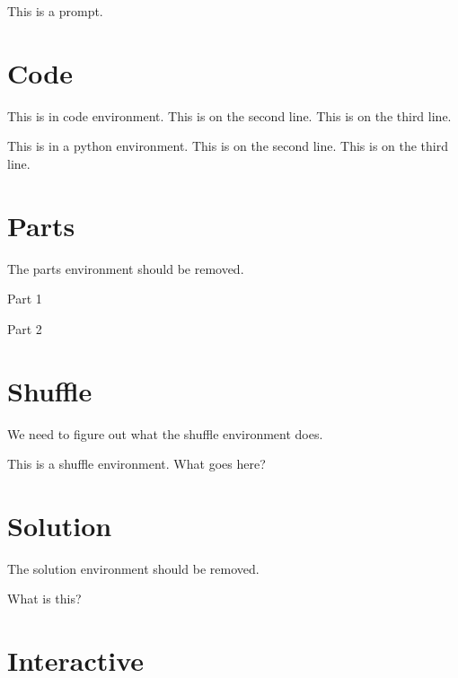 \documentclass{ximera}
\begin{document}
\begin{prompt}
This is a prompt.
\end{prompt}

\section{Code}

\begin{code}
This is in code environment.
This is on the second line.
This is on the third line.
\end{code}

\begin{python}
This is in a python environment.
This is on the second line.
This is on the third line.
\end{python}

\section{Parts}

The parts environment should be removed.

\begin{parts} %
\item Part 1
\item Part 2
\end{parts}

\section{Shuffle}

We need to figure out what the shuffle environment does.

\begin{shuffle}
This is a shuffle environment. What goes here?
\end{shuffle}



\section{Solution}

The solution environment should be removed.

\begin{solution} %
What is this?
\end{solution}

\section{Interactive}
\end{document}
